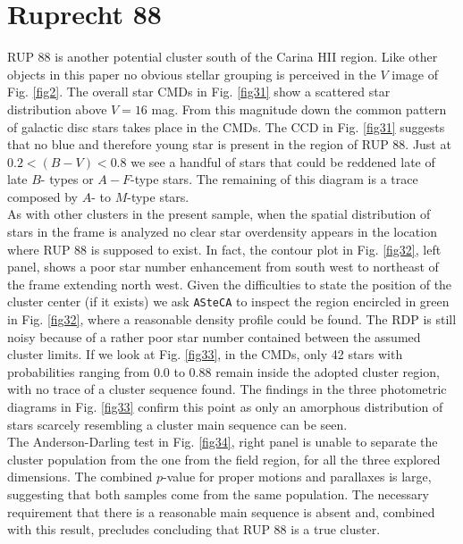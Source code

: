 \documentclass[draft]{aa}
\begin{document}
\section{Ruprecht 88}

RUP 88 is another potential cluster south of the Carina HII region. Like
other objects in this paper no obvious stellar grouping is perceived in the $V$
image of Fig. \ref{fig2}. The overall star CMDs in Fig. \ref{fig31} show a
scattered star distribution above $V = 16$ mag. From this magnitude down the
common pattern of galactic disc stars takes place in the CMDs. The CCD in Fig.
\ref{fig31} suggests that no blue and therefore young star is present in the
region of RUP 88. Just at $0.2 < (B-V) < 0.8$ we see a handful of stars that
could be reddened late of late $B$- types or $A-F$-type stars. The remaining of
this diagram is a trace composed by $A$- to $M$-type stars.\\

As with other clusters in the present sample, when the spatial distribution
of stars in the frame is analyzed no clear star overdensity
appears in the location where RUP 88 is supposed to exist. In fact, the
contour plot in Fig. \ref{fig32}, left panel, shows a poor star number
enhancement from south west to northeast of the frame extending north west.
Given the difficulties to state the position of the cluster center (if it
exists) we ask \texttt{ASteCA} to inspect the region encircled in green in Fig.
\ref{fig32}, where a reasonable density profile could be found. The
RDP is still noisy because of a rather poor star number contained between the
assumed cluster limits. If we look at Fig. \ref{fig33}, in the CMDs, only 42
stars with probabilities ranging from 0.0 to 0.88 remain inside the adopted
cluster region, with no trace of a cluster sequence found. The findings in
the three photometric diagrams in Fig. \ref{fig33} confirm this point as only an
amorphous distribution of stars scarcely resembling a cluster main sequence can
be seen.\\

The Anderson-Darling test in Fig. \ref{fig34}, right panel is unable to
separate the cluster population from the one from the field region, for all the
three explored dimensions. The combined $p$-value for proper motions and
parallaxes is large, suggesting that both samples come from the same
population. The necessary requirement that there is a reasonable main
sequence is absent and, combined with this result, precludes
concluding that RUP 88 is a true cluster.
\end{document}
